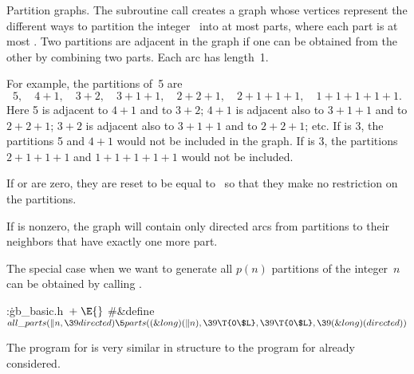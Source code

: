 Partition graphs. The subroutine call
creates a graph whose vertices represent the different ways to partition
the integer~ into at most  parts, where each part is
at most
. Two partitions are adjacent in the graph if
one can be obtained from the other by combining two parts.
Each arc has length~1.

For example, the partitions of~5 are
$$5,\quad 4+1,\quad 3+2,\quad 3+1+1,\quad 2+2+1,
\quad 2+1+1+1,\quad 1+1+1+1+1.$$
Here 5 is adjacent to $4+1$ and to $3+2$; $4+1$ is adjacent also to
$3+1+1$ and to $2+2+1$; $3+2$ is adjacent also to $3+1+1$ and to $2+2+1$; etc.
If  is 3, the partitions 5 and $4+1$ would not be included in
the graph. If  is 3, the partitions $2+1+1+1$ and
$1+1+1+1+1$
would not be included.

If  or  are zero, they are reset to be
equal to~
so that they make no restriction on the partitions.

If  is nonzero, the graph will contain only directed arcs from
partitions to their neighbors that have exactly one more part.

The special case when we want to generate all $p(n)$ partitions of the
integer~$n$ can be obtained by calling .

\Y\B\4:\.{gb\_basic.h\,}\X${}\mathrel+\E{}$\6
\8\#\&{define} ${}\\{all\_parts}(\|n,\39\\{directed})\5\\{parts}((\&{long})(%
\|n),\39\T{0\$L},\39\T{0\$L},\39(\&{long})(\\{directed})){}$\par
\fi

The program for  is very similar in structure to the
program
for  already considered.

